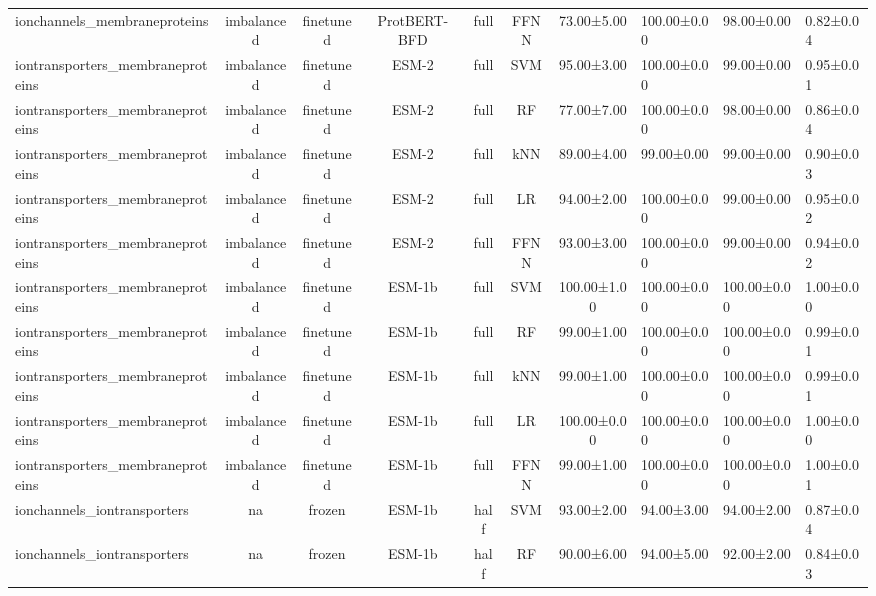 \begin{tabular}{lcccccc}
    ionchannels\_membraneproteins & imbalanced &      finetuned & ProtBERT-BFD &      full &       FFNN &  73.00±5.00 & 100.00±0.00 &  98.00±0.00 & 0.82±0.04 \\
iontransporters\_membraneproteins & imbalanced &      finetuned &        ESM-2 &      full &        SVM &  95.00±3.00 & 100.00±0.00 &  99.00±0.00 & 0.95±0.01 \\
iontransporters\_membraneproteins & imbalanced &      finetuned &        ESM-2 &      full &         RF &  77.00±7.00 & 100.00±0.00 &  98.00±0.00 & 0.86±0.04 \\
iontransporters\_membraneproteins & imbalanced &      finetuned &        ESM-2 &      full &        kNN &  89.00±4.00 &  99.00±0.00 &  99.00±0.00 & 0.90±0.03 \\
iontransporters\_membraneproteins & imbalanced &      finetuned &        ESM-2 &      full &         LR &  94.00±2.00 & 100.00±0.00 &  99.00±0.00 & 0.95±0.02 \\
iontransporters\_membraneproteins & imbalanced &      finetuned &        ESM-2 &      full &       FFNN &  93.00±3.00 & 100.00±0.00 &  99.00±0.00 & 0.94±0.02 \\
iontransporters\_membraneproteins & imbalanced &      finetuned &       ESM-1b &      full &        SVM & 100.00±1.00 & 100.00±0.00 & 100.00±0.00 & 1.00±0.00 \\
iontransporters\_membraneproteins & imbalanced &      finetuned &       ESM-1b &      full &         RF &  99.00±1.00 & 100.00±0.00 & 100.00±0.00 & 0.99±0.01 \\
iontransporters\_membraneproteins & imbalanced &      finetuned &       ESM-1b &      full &        kNN &  99.00±1.00 & 100.00±0.00 & 100.00±0.00 & 0.99±0.01 \\
iontransporters\_membraneproteins & imbalanced &      finetuned &       ESM-1b &      full &         LR & 100.00±0.00 & 100.00±0.00 & 100.00±0.00 & 1.00±0.00 \\
iontransporters\_membraneproteins & imbalanced &      finetuned &       ESM-1b &      full &       FFNN &  99.00±1.00 & 100.00±0.00 & 100.00±0.00 & 1.00±0.01 \\
     ionchannels\_iontransporters &         na &         frozen &       ESM-1b &      half &        SVM &  93.00±2.00 &  94.00±3.00 &  94.00±2.00 & 0.87±0.04 \\
     ionchannels\_iontransporters &         na &         frozen &       ESM-1b &      half &         RF &  90.00±6.00 &  94.00±5.00 &  92.00±2.00 & 0.84±0.03 \\

\end{tabular}
